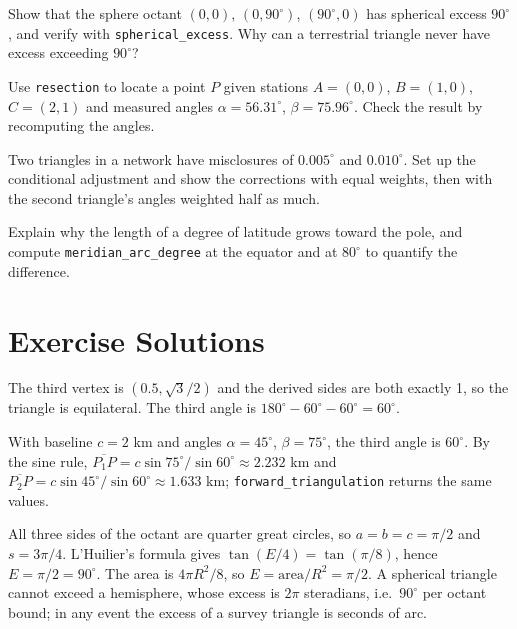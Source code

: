 \begin{exercise}
Show that the sphere octant $(0,0)$, $(0,90^\circ)$, $(90^\circ,0)$ has spherical excess $90^\circ$, and verify with \texttt{spherical\_excess}. Why can a terrestrial triangle never have excess exceeding $90^\circ$?
\end{exercise}

\begin{exercise}
Use \texttt{resection} to locate a point $P$ given stations $A = (0,0)$, $B = (1,0)$, $C = (2,1)$ and measured angles $\alpha = 56.31^\circ$, $\beta = 75.96^\circ$. Check the result by recomputing the angles.
\end{exercise}

\begin{exercise}
Two triangles in a network have misclosures of $0.005^\circ$ and $0.010^\circ$. Set up the conditional adjustment and show the corrections with equal weights, then with the second triangle's angles weighted half as much.
\end{exercise}

\begin{exercise}
Explain why the length of a degree of latitude grows toward the pole, and compute \texttt{meridian\_arc\_degree} at the equator and at $80^\circ$ to quantify the difference.
\end{exercise}

\section{Exercise Solutions}

\begin{solution}
The third vertex is $(0.5, \sqrt{3}/2)$ and the derived sides are both exactly 1, so the triangle is equilateral. The third angle is $180^\circ - 60^\circ - 60^\circ = 60^\circ$.
\end{solution}

\begin{solution}
With baseline $c = 2$ km and angles $\alpha = 45^\circ$, $\beta = 75^\circ$, the third angle is $60^\circ$. By the sine rule, $\overline{P_1P} = c \sin 75^\circ/\sin 60^\circ \approx 2.232$ km and $\overline{P_2P} = c \sin 45^\circ/\sin 60^\circ \approx 1.633$ km; \texttt{forward\_triangulation} returns the same values.
\end{solution}

\begin{solution}
All three sides of the octant are quarter great circles, so $a = b = c = \pi/2$ and $s = 3\pi/4$. L'Huilier's formula gives $\tan(E/4) = \tan(\pi/8)$, hence $E = \pi/2 = 90^\circ$. The area is $4\pi R^2/8$, so $E = \text{area}/R^2 = \pi/2$. A spherical triangle cannot exceed a hemisphere, whose excess is $2\pi$ steradians, i.e.\ $90^\circ$ per octant bound; in any event the excess of a survey triangle is seconds of arc.
\end{solution}

